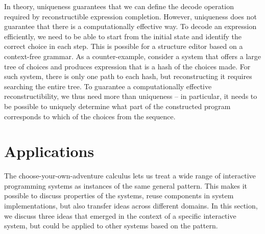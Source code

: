 \documentclass[ a4paper,UKenglish,cleveref, autoref, thm-restate]{lipics-v2021}
\newcommand{\ident}[1]{\textsf{#1}}
\begin{document}
In theory, uniqueness guarantees that we can define the \ident{decode} operation required
by reconstructible expression completion. However, uniqueness does not guarantee that there is
a computationally effective way. To decode an expression efficiently, we need to be able to
start from the initial state and identify the correct choice in each step. This is possible for
a structure editor based on a context-free grammar. As a counter-example, consider a system that
offers a large tree of choices and produces expression that is a hash of the choices made. For
such system, there is only one path to each hash, but reconstructing it requires searching the
entire tree. To guarantee a computationally effective reconstructibility, we thus need more than
uniqueness -- in particular, it needs to be possible to uniquely determine what part of the
constructed program corresponds to which of the choices from the sequence.

\section{Applications}
\label{sec:applications}

The choose-your-own-adventure calculus lets us treat a wide range of interactive programming
systems as instances of the same general pattern. This makes it possible to discuss properties
of the systems, reuse components in system implementations,
but also transfer ideas across different domains. In this section, we discuss three ideas that
emerged in the context of a specific interactive system, but could be applied to other systems
based on the pattern.
\end{document}
